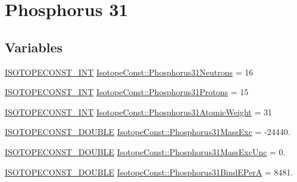 \hypertarget{group___isotope_const-_phosphorus-_p31}{}\section{Phosphorus 31}
\label{group___isotope_const-_phosphorus-_p31}
\subsection*{Variables}
\begin{DoxyCompactItemize}
\item 
\mbox{\hyperlink{group___isotope_const-_macros_ga5f18360b3e99483a35c32d789e62621c}{I\+S\+O\+T\+O\+P\+E\+C\+O\+N\+S\+T\+\_\+\+I\+NT}} \mbox{\hyperlink{group___isotope_const-_phosphorus-_p31_ga8e11e84dc81184cb5724c1b01e0c64f1}{Isotope\+Const\+::\+Phosphorus31\+Neutrons}} = 16
\item 
\mbox{\hyperlink{group___isotope_const-_macros_ga5f18360b3e99483a35c32d789e62621c}{I\+S\+O\+T\+O\+P\+E\+C\+O\+N\+S\+T\+\_\+\+I\+NT}} \mbox{\hyperlink{group___isotope_const-_phosphorus-_p31_ga4862a6d88e99a3d2a8075418c693ce5e}{Isotope\+Const\+::\+Phosphorus31\+Protons}} = 15
\item 
\mbox{\hyperlink{group___isotope_const-_macros_ga5f18360b3e99483a35c32d789e62621c}{I\+S\+O\+T\+O\+P\+E\+C\+O\+N\+S\+T\+\_\+\+I\+NT}} \mbox{\hyperlink{group___isotope_const-_phosphorus-_p31_ga5219ac33a0440912ba38db9c1a6091a3}{Isotope\+Const\+::\+Phosphorus31\+Atomic\+Weight}} = 31
\item 
\mbox{\hyperlink{group___isotope_const-_macros_ga8f45a7272ce02c0b4c65c44636ed719a}{I\+S\+O\+T\+O\+P\+E\+C\+O\+N\+S\+T\+\_\+\+D\+O\+U\+B\+LE}} \mbox{\hyperlink{group___isotope_const-_phosphorus-_p31_gaa22b330965182eb12663f3a8bd24e355}{Isotope\+Const\+::\+Phosphorus31\+Mass\+Exc}} = -\/24440.
\item 
\mbox{\hyperlink{group___isotope_const-_macros_ga8f45a7272ce02c0b4c65c44636ed719a}{I\+S\+O\+T\+O\+P\+E\+C\+O\+N\+S\+T\+\_\+\+D\+O\+U\+B\+LE}} \mbox{\hyperlink{group___isotope_const-_phosphorus-_p31_ga8db879bf9008994a56147042215b8011}{Isotope\+Const\+::\+Phosphorus31\+Mass\+Exc\+Unc}} = 0.
\item 
\mbox{\hyperlink{group___isotope_const-_macros_ga8f45a7272ce02c0b4c65c44636ed719a}{I\+S\+O\+T\+O\+P\+E\+C\+O\+N\+S\+T\+\_\+\+D\+O\+U\+B\+LE}} \mbox{\hyperlink{group___isotope_const-_phosphorus-_p31_ga53f9df59cba39430d86f85f97181fc6f}{Isotope\+Const\+::\+Phosphorus31\+Bind\+E\+PerA}} = 8481.
\item 

\end{DoxyCompactItemize}
